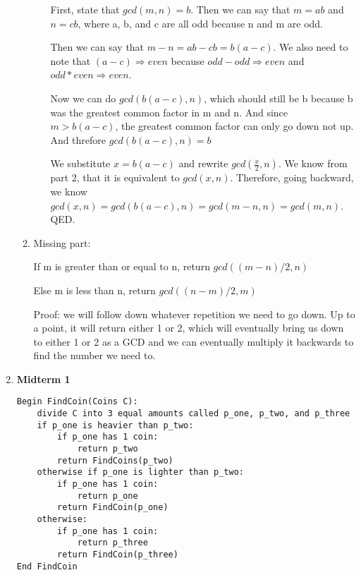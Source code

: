 \documentclass[12pt,fleqn]{article}
\begin{document}
\begin{enumerate}
\begin{enumerate}
\begin{enumerate}
		First, state that $gcd(m,n) = b$. Then we can say that $m = ab$ and $n = cb$, where a, b, and c are all odd because n and m are odd. 
		
		Then we can say that $m - n = ab - cb = b(a - c)$. We also need to note that $(a - c) \Rightarrow even$ because $odd-odd \Rightarrow even$ and $odd * even \Rightarrow even$.
		
		Now we can do $gcd(b(a - c), n)$, which should still be b because b was the greatest common factor in m and n. And since $m > b(a - c)$, the greatest common factor can only go down not up. And threfore $gcd(b(a - c), n) = b$
		
		We substitute $x = b(a - c)$ and rewrite $gcd(\frac{x}{2}, n)$. We know from part 2, that it is equivalent to $gcd(x, n)$. Therefore, going backward, we know $gcd(x, n) = gcd(b(a-c), n) = gcd(m - n, n) = gcd(m, n)$. QED.
	\end{enumerate}
    
    \item 
    Missing part: 
    
    If m is greater than or equal to n, return $gcd( (m-n)/2, n)$
    
    Else m is less than n, return $gcd((n-m)/2, m)$
    
    Proof: we will follow down whatever repetition we need to go down. Up to a point, it will return either 1 or 2, which will eventually bring us down to either 1 or 2 as a GCD and we can eventually multiply it backwards to find the number we need to.
    \end{enumerate}
  
  
  \newpage
  \item \textbf{Midterm 1}

  \begin{lstlisting}
Begin FindCoin(Coins C):
	divide C into 3 equal amounts called p_one, p_two, and p_three
	if p_one is heavier than p_two:
		if p_one has 1 coin:
			return p_two
		return FindCoins(p_two)
	otherwise if p_one is lighter than p_two:
		if p_one has 1 coin:
			return p_one
		return FindCoin(p_one)
	otherwise:
		if p_one has 1 coin:
			return p_three
		return FindCoin(p_three)
End FindCoin
\end{lstlisting}


\end{enumerate}
\end{document}
